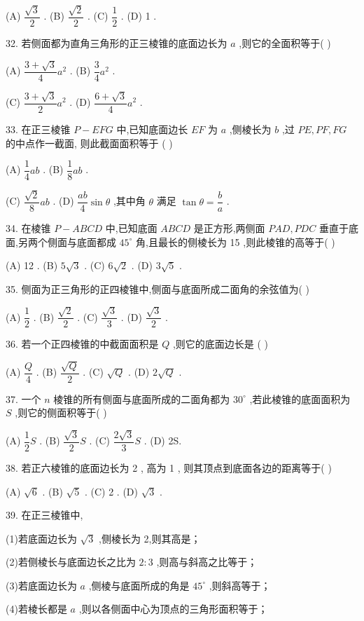 (A) $\dfrac{\sqrt{3}}{2}$ . (B) $\dfrac{\sqrt{2}}{2}$ . (C) $\dfrac{1}{2}$ . (D) 1 .

32. 若侧面都为直角三角形的正三棱锥的底面边长为 $a$ ,则它的全面积等于(   )

(A) $\dfrac{3 + \sqrt{3}}{4}{a}^{2}$ . (B) $\dfrac{3}{4}{a}^{2}$ .

(C) $\dfrac{3 + \sqrt{3}}{2}{a}^{2}$ . (D) $\dfrac{6 + \sqrt{3}}{4}{a}^{2}$ .

33. 在正三棱锥 $P - {EFG}$ 中,已知底面边长 ${EF}$ 为 $a$ ,侧棱长为 $b$ ,过 ${PE},{PF},{FG}$ 的中点作一截面, 则此截面面积等于 (   )

(A) $\dfrac{1}{4}{ab}$ . (B) $\dfrac{1}{8}{ab}$ .

(C) $\dfrac{\sqrt{2}}{8}{ab}$ . (D) $\dfrac{ab}{4}\sin \theta$ ,其中角 $\theta$ 满足 $\tan \theta  = \dfrac{b}{a}$ .

34. 在棱锥 $P - {ABCD}$ 中,已知底面 ${ABCD}$ 是正方形,两侧面 ${PAD},{PDC}$ 垂直于底面,另两个侧面与底面都成 ${45}^{ \circ  }$ 角,且最长的侧棱长为 15 ,则此棱锥的高等于(   )

(A) 12 . (B) $5\sqrt{3}$ . (C) $6\sqrt{2}$ . (D) $3\sqrt{5}$ .

35. 侧面为正三角形的正四棱锥中,侧面与底面所成二面角的余弦值为(   )

(A) $\dfrac{1}{2}$ . (B) $\dfrac{\sqrt{2}}{2}$ . (C) $\dfrac{\sqrt{3}}{3}$ . (D) $\dfrac{\sqrt{3}}{2}$ .

36. 若一个正四棱锥的中截面面积是 $Q$ ,则它的底面边长是 (   )

(A) $\dfrac{Q}{4}$ . (B) $\dfrac{\sqrt{Q}}{2}$ . (C) $\sqrt{Q}$ . (D) $2\sqrt{Q}$ .

37. 一个 $n$ 棱锥的所有侧面与底面所成的二面角都为 ${30}^{ \circ  }$ ,若此棱锥的底面面积为 $S$ ,则它的侧面积等于(   )

(A) $\dfrac{1}{2}S$ . (B) $\dfrac{\sqrt{3}}{2}S$ . (C) $\dfrac{2\sqrt{3}}{3}S$ . (D) 2S.

38. 若正六棱锥的底面边长为 2 , 高为 1 , 则其顶点到底面各边的距离等于(   )

(A) $\sqrt{6}$ . (B) $\sqrt{5}$ . (C) 2 . (D) $\sqrt{3}$ .

39. 在正三棱锥中,

(1)若底面边长为 $\sqrt{3}$ ,侧棱长为 2,则其高是\blkda{}；

(2)若侧棱长与底面边长之比为 $2 : 3$ ,则高与斜高之比等于\blkda{}；

(3)若底面边长为 $a$ ,侧棱与底面所成的角是 ${45}^{ \circ  }$ ,则斜高等于\blkda{}；

(4)若棱长都是 $a$ ,则以各侧面中心为顶点的三角形面积等于\blkda{}；

